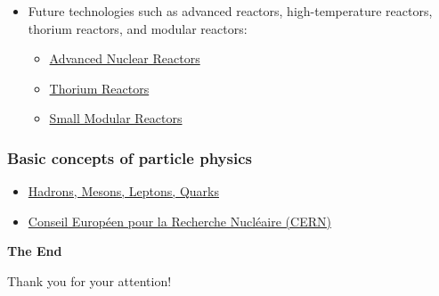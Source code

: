 \documentclass[t,aspectratio=169,xcolor=dvipsnames]{beamer}
\begin{document}
\begin{frame}
\begin{itemize}
\item Future technologies such as advanced reactors, high-temperature reactors, thorium reactors, and modular reactors:
  \begin{itemize}
  \item \href{https://world-nuclear.org/information-library/nuclear-power-reactors/other/advanced-nuclear-power-reactors}{Advanced Nuclear Reactors}
  \item \href{https://world-nuclear.org/information-library/current-and-future-generation/thorium}{Thorium Reactors}
  \item \href{https://world-nuclear.org/information-library/nuclear-power-reactors/small-modular-reactors/small-modular-reactors}{Small Modular Reactors}
  \end{itemize}
\end{itemize}
\end{frame}


\begin{frame}%
\frametitle{Basic concepts of particle physics}
\begin{itemize}
\setlength{\parskip}{0pt}
\setlength{\itemsep}{0pt}
\item \href{https://www.britannica.com/science/standard-model}{Hadrons, Mesons, Leptons, Quarks}
\item \href{https://home.cern/}{Conseil Européen pour la Recherche Nucléaire (CERN)}
\end{itemize}
\end{frame}


\begin{frame}

\vfill
\begin{center}
\textbf{\huge The End}

\bigskip
Thank you for your attention!
\end{center}
\vfill
\end{frame}
\end{document}
